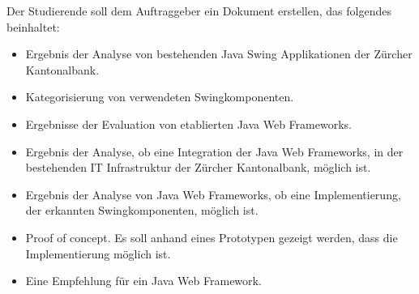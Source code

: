 Der Studierende soll dem Auftraggeber ein Dokument erstellen, das folgendes
beinhaltet:

\begin{itemize}    
  \item Ergebnis der Analyse von bestehenden Java Swing Applikationen der
  Zürcher Kantonalbank.
  \item Kategorisierung von verwendeten Swingkomponenten.
  \item Ergebnisse der Evaluation von etablierten Java Web Frameworks.
  \item Ergebnis der Analyse, ob eine Integration der Java Web Frameworks, in
  der bestehenden IT Infrastruktur der Zürcher Kantonalbank, möglich ist.
  \item Ergebnis der Analyse von Java Web Frameworks, ob eine Implementierung,
  der erkannten Swingkomponenten, möglich ist.
  \item Proof of concept. Es soll anhand eines Prototypen gezeigt werden, dass
  die Implementierung möglich ist.
  \item Eine Empfehlung für ein Java Web Framework.
\end{itemize}